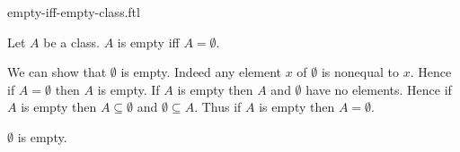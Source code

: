 \documentclass{article}
\begin{document}
\begin{smodule}{empty-iff-empty-class.ftl}

  \begin{fproposition*}[label=2263153161273344]
    Let $A$ be a class.
    $A$ is empty iff $A = \emptyset$.
  \end{fproposition*}
  \begin{fproof*}
    We can show that $\emptyset$ is empty.
    Indeed any element $x$ of $\emptyset$ is nonequal to $x$.
    Hence if $A = \emptyset$ then $A$ is empty.
    If $A$ is empty then $A$ and $\emptyset$ have no elements.
    Hence if $A$ is empty then $A \subseteq \emptyset$ and
    $\emptyset \subseteq A$.
    Thus if $A$ is empty then $A = \emptyset$.
  \end{fproof*}

  \begin{fcorollary*}[label=1495141426659328]
    $\emptyset$ is empty.
  \end{fcorollary*}
\end{smodule}
\end{document}
